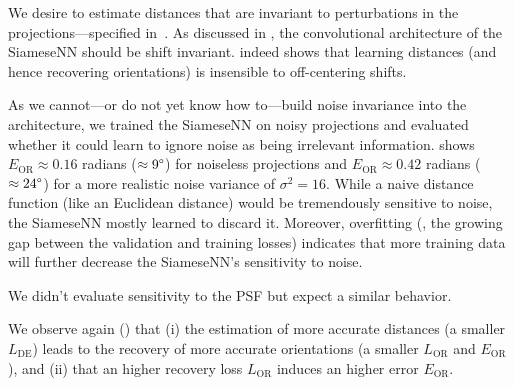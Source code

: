 
We desire to estimate distances that are invariant to perturbations in the projections---specified in~.
As discussed in , the convolutional architecture of the SiameseNN should be shift invariant.
 indeed shows that learning distances (and hence recovering orientations) is insensible to off-centering shifts.

As we cannot---or do not yet know how to---build noise invariance into the architecture, we trained the SiameseNN on noisy projections and evaluated whether it could learn to ignore noise as being irrelevant information.
 shows $E_\text{OR} \approx 0.16$ radians ($\approx 9\degree$) for noiseless projections and $E_\text{OR} \approx 0.42$ radians ($\approx 24\degree$) for a more realistic noise variance of $\sigma^2=16$.
While a naive distance function (like an Euclidean distance) would be tremendously sensitive to noise, the SiameseNN mostly learned to discard it.
Moreover, overfitting (\ie, the growing gap between the validation and training losses) indicates that more training data will further decrease the SiameseNN's sensitivity to noise.

We didn't evaluate sensitivity to the PSF but expect a similar behavior.

We observe again () that (i) the estimation of more accurate distances (a smaller $L_\text{DE}$) leads to the recovery of more accurate orientations (a smaller $L_\text{OR}$ and $E_\text{OR}$), and (ii) that an higher recovery loss $L_\text{OR}$ induces an higher error $E_\text{OR}$.

